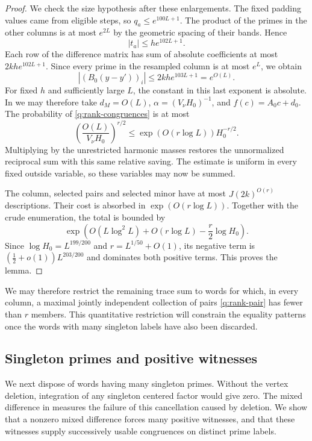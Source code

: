 \begin{proof}
We check the size hypothesis after these enlargements.  The fixed
padding values came from eligible steps, so $q_a\le e^{100L+1}$.
The product of the primes in the other columns is at most $e^{2L}$
by the geometric spacing of their bands.  Hence
\[
 |t_a|\le h e^{102L+1}.
\]
Each row of the difference matrix has sum of absolute coefficients
at most $2kh e^{102L+1}$.  Since every prime in the resampled column
is at most $e^L$, we obtain
\[
 |(B_0(y-y'))_i|\le 2kh e^{103L+1}=e^{O(L)}.
\]
For fixed $h$ and sufficiently large $L$, the constant in this last
exponent is absolute.  In  we may therefore
take $d_M=O(L)$, $\alpha=(V_\nu H_0)^{-1}$, and
$f(c)=A_0c+d_0$.  The probability of \eqref{q:rank-congruences} is at
most
\[
 \left(\frac{O(L)}{V_\nu H_0}\right)^{r/2}
 \le \exp(O(r\log L))H_0^{-r/2}.
\]
Multiplying by the unrestricted harmonic masses restores the
unnormalized reciprocal sum with this same relative saving.
The estimate is uniform in every fixed outside variable, so these
variables may now be summed.

The column, selected pairs and selected minor have at most
$J(2k)^{O(r)}$ descriptions.  Their cost is absorbed in
$\exp(O(r\log L))$.  Together with the crude enumeration, the total
is bounded by
\[
 \exp\left(O(L\log^2L)+O(r\log L)-\frac r2\log H_0\right).
\]
Since $\log H_0=L^{199/200}$ and
$r=L^{1/50}+O(1)$, its negative term is
$(\tfrac12+o(1))L^{203/200}$ and dominates both positive terms.
This proves the lemma.
\end{proof}

We may therefore restrict the remaining trace sum to words for which,
in every column, a maximal jointly independent collection of pairs
\eqref{q:rank-pair} has fewer than $r$ members.  This quantitative
restriction will constrain the equality patterns once the words with
many singleton labels have also been discarded.

\subsection{Singleton primes and positive witnesses}

We next dispose of words having many singleton primes.  Without the
vertex deletion, integration of any singleton centered factor would give
zero.  The mixed difference in  measures the
failure of this cancellation caused by deletion.  We show that a nonzero
mixed difference forces many positive witnesses, and that these witnesses
supply successively usable congruences on distinct prime labels.

